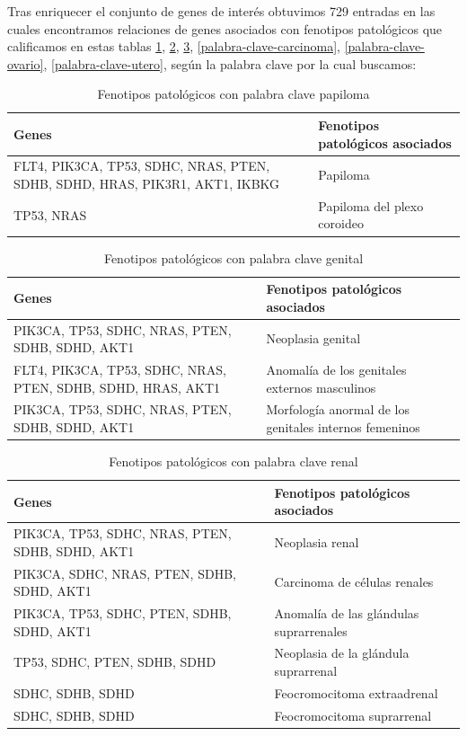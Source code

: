 Tras enriquecer el conjunto de genes de interés obtuvimos 729 entradas en las cuales encontramos relaciones de genes asociados con fenotipos patológicos que calificamos en estas tablas \ref{palabra-clave-papiloma}, \ref{palabra-clave-genital}, \ref{palabra-clave-renal}, \ref{palabra-clave-carcinoma}, \ref{palabra-clave-ovario}, \ref{palabra-clave-utero}, según la palabra clave por la cual buscamos:

\begin{table}[h]
	\centering
	\caption{Fenotipos patológicos con palabra clave papiloma}
	\begin{tabular}{|p{6cm}|p{6cm}|}
		\hline
		\textbf{Genes} & \textbf{Fenotipos patológicos asociados} \\
		\hline
		FLT4, PIK3CA, TP53, SDHC, NRAS, PTEN, SDHB, SDHD, HRAS, PIK3R1, AKT1, IKBKG & Papiloma \\
		\hline
		TP53, NRAS & Papiloma del plexo coroideo \\
		\hline
	\end{tabular}
	\label{palabra-clave-papiloma}
\end{table}

\begin{table}[h]
	\centering
	\caption{Fenotipos patológicos con palabra clave genital}
	\begin{tabular}{|p{6cm}|p{6cm}|}
		\hline
		\textbf{Genes} & \textbf{Fenotipos patológicos asociados} \\
		\hline
		PIK3CA, TP53, SDHC, NRAS, PTEN, SDHB, SDHD, AKT1 & Neoplasia genital \\
		\hline
		FLT4, PIK3CA, TP53, SDHC, NRAS, PTEN, SDHB, SDHD, HRAS, AKT1 & Anomalía de los genitales externos masculinos \\
		\hline
		PIK3CA, TP53, SDHC, NRAS, PTEN, SDHB, SDHD, AKT1 & Morfología anormal de los genitales internos femeninos \\
		\hline
	\end{tabular}
	\label{palabra-clave-genital}
\end{table}

\begin{table}[h]
	\centering
	\caption{Fenotipos patológicos con palabra clave renal}
	\begin{tabular}{|p{6cm}|p{6cm}|}
		\hline
		\textbf{Genes} & \textbf{Fenotipos patológicos asociados} \\
		\hline
		PIK3CA, TP53, SDHC, NRAS, PTEN, SDHB, SDHD, AKT1 & Neoplasia renal \\
		\hline
		PIK3CA, SDHC, NRAS, PTEN, SDHB, SDHD, AKT1 & Carcinoma de células renales \\
		\hline
		PIK3CA, TP53, SDHC, PTEN, SDHB, SDHD, AKT1 & Anomalía de las glándulas suprarrenales \\
		\hline
		TP53, SDHC, PTEN, SDHB, SDHD & Neoplasia de la glándula suprarrenal \\
		\hline
		SDHC, SDHB, SDHD & Feocromocitoma extraadrenal \\
		\hline
		SDHC, SDHB, SDHD & Feocromocitoma suprarrenal \\
		\hline
	\end{tabular}
	\label{palabra-clave-renal}
\end{table}


